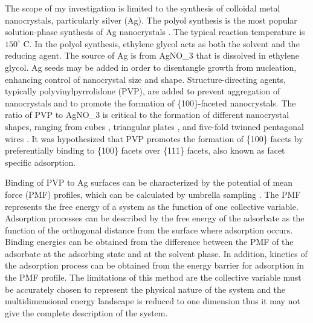 
The scope of my investigation is limited to the synthesis of colloidal metal nanocrystals, particularly silver (Ag).
The polyol synthesis is the most popular solution-phase synthesis of Ag nanocrystals \cite{Skrabalak_2007}.
The typical reaction temperature is $150^{\circ}$ C.
In the polyol synthesis, ethylene glycol acts as both the solvent and the reducing agent.
The source of Ag is from AgNO_3 that is dissolved in ethylene glycol.
Ag seeds may be added in order to disentangle growth from nucleation, enhancing control of nanocrystal size and shape.
Structure-directing agents, typically polyvinylpyrrolidone (PVP), are added to prevent aggregation of nanocrystals and to promote the formation of \{100\}-faceted nanocrystals.
The ratio of PVP to AgNO_3 is critical to the formation of different nanocrystal shapes, ranging from cubes \cite{Xia_2012,Zhang_2010}, triangular plates \cite{Lofton_2005,Liu_2012}, and five-fold twinned pentagonal wires \cite{Zhu_2011,Zhang_2008,Sun_2002}.
It was hypothesized that PVP promotes the formation of \{100\} facets by preferentially binding to \{100\} facets over \{111\} facets\cite{Xia_2012,Sun_2002}, also known as facet specific adsorption.

Binding of PVP to Ag surfaces can be characterized by the potential of mean force (PMF) profiles, which can be calculated by umbrella sampling \cite{Torrie_1977,K_stner_2011}.
The PMF represents the free energy of a system as the function of one collective variable.
Adsorption processes can be described by the free energy of the adsorbate as the function of the orthogonal distance from the surface where adsorption occurs.
Binding energies can be obtained from the difference between the PMF of the adsorbate at the adsorbing state and at the solvent phase.
In addition, kinetics of the adsorption process can be obtained from the energy barrier for adsorption in the PMF profile.
The limitations of this method are the collective variable must be accurately chosen to represent the physical nature of the system and the multidimensional energy landscape is reduced to one dimension thus it may not give the complete description of the system.
  
  